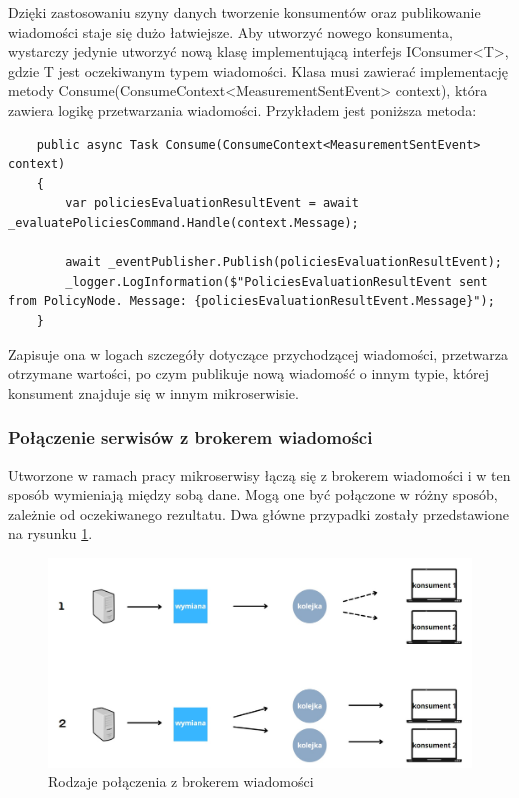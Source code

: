 \documentclass[11pt, a4]{article} %
\begin{document}
Dzięki zastosowaniu szyny danych tworzenie konsumentów oraz publikowanie wiadomości 
staje się dużo łatwiejsze. Aby utworzyć nowego konsumenta, wystarczy jedynie utworzyć 
nową klasę implementującą interfejs IConsumer<T>, gdzie T jest oczekiwanym typem 
wiadomości. Klasa musi zawierać implementację metody 
Consume(ConsumeContext<MeasurementSentEvent> context), która zawiera logikę 
przetwarzania wiadomości. Przykładem jest poniższa metoda:

\begin{lstlisting}
    public async Task Consume(ConsumeContext<MeasurementSentEvent> context)
    {
        var policiesEvaluationResultEvent = await _evaluatePoliciesCommand.Handle(context.Message);

        await _eventPublisher.Publish(policiesEvaluationResultEvent);
        _logger.LogInformation($"PoliciesEvaluationResultEvent sent from PolicyNode. Message: {policiesEvaluationResultEvent.Message}");
    }

    \end{lstlisting}
    
Zapisuje ona w logach szczegóły dotyczące przychodzącej wiadomości, przetwarza 
otrzymane wartości, po czym publikuje nową wiadomość o innym typie, której konsument 
znajduje się w innym mikroserwisie.

\subsubsection{Połączenie serwisów z brokerem wiadomości}

Utworzone w ramach pracy mikroserwisy łączą się z brokerem wiadomości i w ten sposób wymieniają między
sobą dane. Mogą one być połączone w różny sposób, zależnie od oczekiwanego rezultatu. Dwa główne
przypadki zostały przedstawione na rysunku \ref{fig:rabbitmq-polaczenie}.

\begin{figure}[h]
    \centering
    \includegraphics[width=1\textwidth]{rabbitmq_schema.jpg}
    \caption{Rodzaje połączenia z brokerem wiadomości}
    \label{fig:rabbitmq-polaczenie}
\end{figure}
\end{document}
